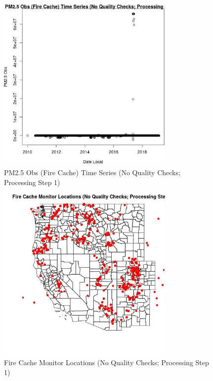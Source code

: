 
\begin{figure} 
\centering  
\includegraphics[width=0.77\textwidth]{Code_Outputs/PM25Source2TSstep1_PM25_ObsvDate_Local.jpg} 
\caption{\label{fig:PM25Source2TSstep1PM25_ObsvDate_Local}PM2.5 Obs (Fire Cache) Time Series (No Quality Checks; Processing Step 1)} 
\end{figure} 
 

\begin{figure} 
\centering  
\includegraphics[width=0.77\textwidth]{Code_Outputs/PM25Source2TSstep1_MapFireCacheLocations.jpg} 
\caption{\label{fig:PM25Source2TSstep1MapFireCacheLocations}Fire Cache Monitor Locations (No Quality Checks; Processing Step 1)} 
\end{figure} 
 
